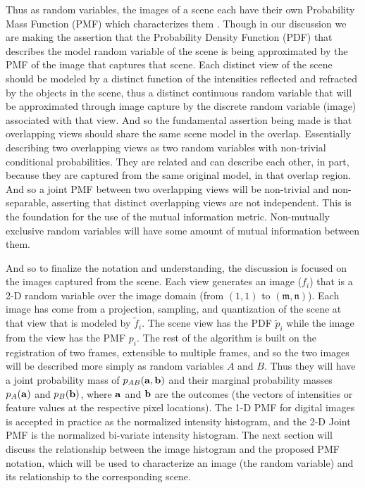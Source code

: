 Thus as random variables, the images of a scene each have their own Probability Mass Function (PMF) which characterizes them \cite{Papoulis2002}. Though in our discussion we are making the assertion that the Probability Density Function (PDF) that describes the model random variable of the scene is being approximated by the PMF of the image that captures that scene. Each distinct view of the scene should be modeled by a distinct function of the intensities reflected and refracted by the objects in the scene, thus a distinct continuous random variable that will be approximated through image capture by the discrete random variable (image) associated with that view. And so the fundamental assertion being made is that overlapping views should share the same scene model in the overlap. Essentially describing two overlapping views as two random variables with non-trivial conditional probabilities. They are related and can describe each other, in part, because they are captured from the same original model, in that overlap region. And so a joint PMF between two overlapping views will be non-trivial and non-separable, asserting that distinct overlapping views are not independent. This is the foundation for the use of the mutual information metric. Non-mutually exclusive random variables will have some amount of mutual information between them.

And so to finalize the notation and understanding, the discussion is focused on the images captured from the scene. Each view generates an image ($f_{i}$) that is a 2-D random variable over the image domain (from $(1,1)$ to $(\mathfrak{m},\mathfrak{n})$). Each image has come from a projection, sampling, and quantization of the scene at that view that is modeled by $\tilde{f}_{i}$. The scene view has the PDF $\tilde{p}_{i}$ while the image from the view has the PMF $p_{i}$. The rest of the algorithm is built on the registration of two frames, extensible to multiple frames, and so the two images will be described more simply as random variables $A$ and $B$. Thus they will have a joint probability mass of $p_{AB}(\bf{a},\bf{b})$ and their marginal probability masses $p_{A}(\bf{a})$ and $p_{B}(\bf{b})$, where $\bf{a}$ and $\bf{b}$ are the outcomes (the vectors of intensities or feature values at the respective pixel locations). The 1-D PMF for digital images is accepted in practice as the normalized intensity histogram, and the 2-D Joint PMF is the normalized bi-variate intensity histogram. The next section will discuss the relationship between the image histogram and the proposed PMF notation, which will be used to characterize an image (the random variable) and its relationship to the corresponding scene.




